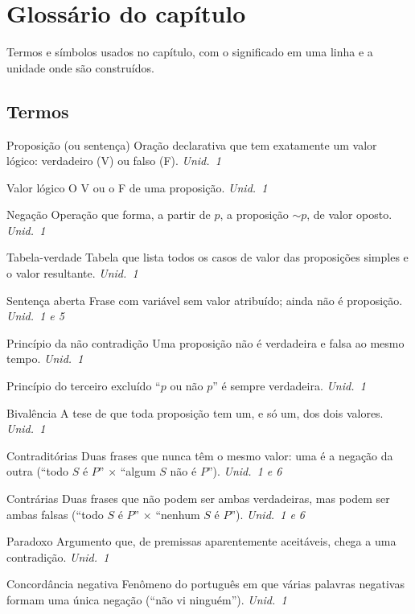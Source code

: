 \section*{Glossário do capítulo}
{\small Termos e símbolos usados no capítulo, com o significado em uma linha e a unidade onde são construídos.}

\subsection*{Termos}
\begin{glossario}
\item[Proposição (ou sentença)] Oração declarativa que tem exatamente um valor lógico: verdadeiro (V) ou falso (F). \hfill\emph{Unid.~1}
\item[Valor lógico] O V ou o F de uma proposição. \hfill\emph{Unid.~1}
\item[Negação] Operação que forma, a partir de $p$, a proposição ${\sim}p$, de valor oposto. \hfill\emph{Unid.~1}
\item[Tabela-verdade] Tabela que lista todos os casos de valor das proposições simples e o valor resultante. \hfill\emph{Unid.~1}
\item[Sentença aberta] Frase com variável sem valor atribuído; ainda não é proposição. \hfill\emph{Unid.~1 e 5}
\item[Princípio da não contradição] Uma proposição não é verdadeira e falsa ao mesmo tempo. \hfill\emph{Unid.~1}
\item[Princípio do terceiro excluído] \enquote{$p$ ou não $p$} é sempre verdadeira. \hfill\emph{Unid.~1}
\item[Bivalência] A tese de que toda proposição tem um, e só um, dos dois valores. \hfill\emph{Unid.~1}
\item[Contraditórias] Duas frases que nunca têm o mesmo valor: uma é a negação da outra (\enquote{todo $S$ é $P$} × \enquote{algum $S$ não é $P$}). \hfill\emph{Unid.~1 e 6}
\item[Contrárias] Duas frases que não podem ser ambas verdadeiras, mas podem ser ambas falsas (\enquote{todo $S$ é $P$} × \enquote{nenhum $S$ é $P$}). \hfill\emph{Unid.~1 e 6}
\item[Paradoxo] Argumento que, de premissas aparentemente aceitáveis, chega a uma contradição. \hfill\emph{Unid.~1}
\item[Concordância negativa] Fenômeno do português em que várias palavras negativas formam uma única negação (\enquote{não vi ninguém}). \hfill\emph{Unid.~1}

\end{glossario}
